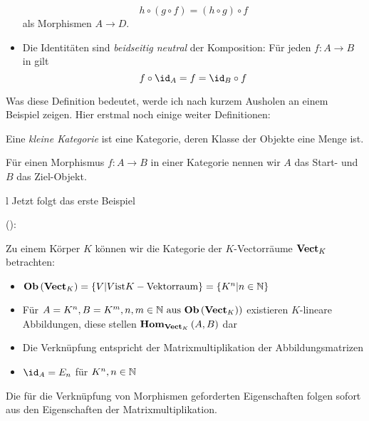\documentclass{article}
\begin{document}
\begin{defi}[Kategorie]
\begin{itemize}
\begin{displaymath}
				h \circ \left( g \circ f \right) = \left( h \circ g \right) \circ f
			\end{displaymath}
			als Morphismen
			\begin{math}
				A \to D.
			\end{math}
			\item Die Identit\"aten sind \emph{beidseitig neutral} \bzgl der Komposition: F\"ur jeden \Mor 
			\begin{math}
				f: A \to B
			\end{math}
			in \CatC gilt
			\begin{displaymath}
				f \circ \id_A = f = \id_B \circ f
			\end{displaymath}
		\end{itemize}
		\end{defi}
		Was  diese Definition bedeutet, werde ich nach kurzem Ausholen an einem Beispiel zeigen.
		Hier erstmal noch einige weiter Definitionen:
		
		\begin{defi} \cite[Definition 2.2.29]{Bra}
		Eine \emph{kleine Kategorie} ist eine Kategorie, deren Klasse der Objekte eine Menge ist.
		\end{defi}
		\begin{defi}  \cite[Bemerkung 2.2.25]{Bra}
		F\"ur einen Morphismus \( f: A \to B \) in einer Kategorie \CatC nennen wir \( A \) das Start- und \( B \) das Ziel-Objekt.
		\end{defi}
		
l		Jetzt folgt das erste Beispiel

		\begin{bsp}
		
	(\cite[Beispiel 2.2.10]{Bra}):
		
		Zu einem K\"orper \( K \) k\"onnen wir die Kategorie der \( K\)-Vectorr\"aume \( \mathbf{Vect}_K \) betrachten:
		\begin{itemize}
			\item	\(  \mathbf{Ob}  \left( \mathbf{Vect}_K \right) = \left\lbrace V | V \text{ist} K-\text{Vektorraum} \right\rbrace  = \left\lbrace K^n | n \in \mathbb{N} \right\rbrace \)
			\item F\"ur  \( A=K^n , B =K^m , n,m \in \BN \ \text{aus} \ \Ob \left( \CatVect_K) \right) \) existieren $K$-lineare Abbildungen, diese stellen \(  \mathbf{Hom } _{\mathbf{Vect}_K}\left( A,B \right) \) dar
			\item Die Verkn\"upfung entspricht der Matrixmultiplikation der Abbildungsmatrizen 
			\item \( \id_A = E_n \) f\"ur \( K^n , n \in \mathbb{N} \)
		 \end{itemize}
		 Die f\"ur die Verkn\"upfung von Morphismen geforderten Eigenschaften folgen sofort aus den Eigenschaften der Matrixmultiplikation.
		 \end{bsp}
		 
\end{document}

